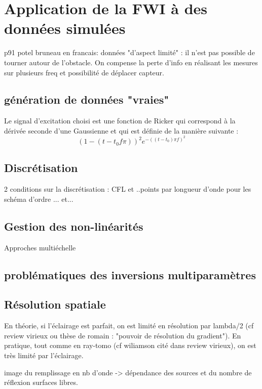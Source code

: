 \chapter{Application de la FWI à des données simulées \label{applications}}

p91 potel bruneau en francais: données "d'aspect limité" : il n'est pas possible de tourner autour de l'obstacle. On compense la perte d'info en réalisant les mesures sur plusieurs freq et possibilité de déplacer capteur.

\section{génération de données "vraies"}
Le signal d'excitation choisi est une fonction de Ricker qui correspond à la dérivée seconde d'une Gaussienne et qui est définie de la manière suivante : 
\begin{equation}
	(1-(t-t_{0}f\pi))^2e^{-((t-t_{0})\pi f)^2}
\end{equation}

\section{Discrétisation}
2 conditions sur la discrétisation : 
CFL et ..points par longueur d'onde pour les schéma d'ordre ... et...

\section{Gestion des non-linéarités}
Approches multiéchelle
	

\section{problématiques des inversions multiparamètres}



\section{Résolution spatiale}
En théorie, si l'éclairage est parfait, on est limité en résolution par lambda/2 (cf review virieux ou thèse de romain : "pouvoir de résolution du gradient"). En pratique, tout comme en ray-tomo (cf wiliamson cité dans review virieux), on est très limité par l'éclairage.

image du remplissage en nb d'onde -> dépendance des sources et du nombre de réflexion surfaces libres.

